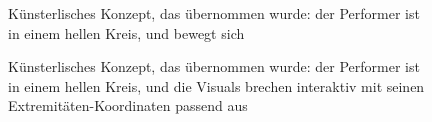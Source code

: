 \begin{figure}[htbp]
    \centering
    \caption{Künsterlisches Konzept, das übernommen wurde: der Performer ist in einem hellen Kreis, und bewegt sich}
    \label{fig:movement_responsive}
\end{figure}

\begin{figure}[htbp]
    \centering
    \caption{Künsterlisches Konzept, das übernommen wurde: der Performer ist in einem hellen Kreis, und die Visuals brechen interaktiv mit seinen Extremitäten-Koordinaten passend aus}
    \label{fig:composite_effects}
\end{figure}






